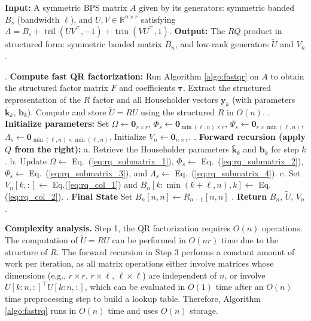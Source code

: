 \documentclass[a4paper,fleqn]{cas-sc}
\def\bfy{{\mathbf y}}
\DeclareMathOperator{\triu}{triu}
\DeclareMathOperator{\tril}{tril}
\begin{document}
\begin{algorithm}\caption{Fast RQ computation for Symmetric BPS Matrices}\label{algo:fastrq}
\begin{algorithmic}
\State \textbf{Input:} A symmetric BPS matrix $A$ given by its generators: symmetric banded $B_s$ (bandwidth $\ell$), and $U, V \in \mathbb{R}^{n \times r}$ satisfying $A = B_s + \tril(UV^\top, -1) + \triu(VU^\top, 1)$.
\State \textbf{Output:} The $RQ$ product in structured form: symmetric banded matrix $B_n$, and low-rank generators $\tilde U$ and $V_n$.

\Statex
{}. \textbf{Compute fast QR factorization:}
\State \quad Run Algorithm \ref{algo:fastqr} on $A$ to obtain the structured factor matrix $F$ and coefficients $\boldsymbol{\tau}$. Extract the structured representation of the $R$ factor and all Householder vectors $\bfy_k$ (with parameters $\bar{\mathbf{k}}_k$, $\mathbf{b}_k$).
\State \quad Compute and store $\tilde U = R U$ using the structured $R$ in $O(n)$.
\Statex
{}. \textbf{Initialize parameters:}
\State \quad Set $\Omega \gets \mathbf{0}_{r \times r}$, $\Phi_s \gets \mathbf{0}_{\min(\ell,n) \times r}$, $\Psi_s \gets \mathbf{0}_{r \times \min(\ell,n)}$, $\Lambda_s \gets \mathbf{0}_{\min(\ell,n) \times \min(\ell,n)}$.
\State \quad Initialize $V_n \gets \mathbf{0}_{n \times r}$.
\Statex
{}. \textbf{Forward recursion (apply $Q$ from the right):}
    \State a. Retrieve the Householder parameters $\bar{\mathbf{k}}_{k}$ and $\mathbf{b}_{k}$ for step $k$.
    \State b. Update
    $\Omega \gets$ Eq.~(\ref{eq:rq_submatrix_1}),
    $\Phi_s \gets$ Eq.~(\ref{eq:rq_submatrix_2}),
    $\Psi_s \gets$ Eq.~(\ref{eq:rq_submatrix_3}),
    and $\Lambda_s \gets$ Eq.~(\ref{eq:rq_submatrix_4}).
    \State c. Set 
    $V_n[k,:] \gets $ Eq.(\ref{eq:rq_col_1}) and $B_n[k:\min(k+\ell,n),k] \gets $ Eq.(\ref{eq:rq_col_2}).
\EndFor
\Statex
{}. \textbf{Final State}
\State \quad Set $B_n[n,n] \gets R_{n-1}[n,n]$
\Statex
{}. \textbf{Return} $B_n$, $\tilde U$, $V_n$.
\end{algorithmic}
\end{algorithm}

\textbf{Complexity analysis.} Step 1, the QR factorization requires $O(n)$ operations. The computation of $\tilde U = RU$ can be performed in $O(nr)$ time due to the structure of $R$. The forward recursion in Step 3 performs a constant amount of work per iteration, as all matrix operations either involve matrices whose dimensions (e.g., $r \times r$, $r \times \ell$, $\ell \times \ell$) are independent of $n$, or involve $U[k:n,:]^\top U[k:n,:]$, which can be evaluated in $O(1)$ time after an $O(n)$ time preprocessing step to build a lookup table. Therefore, Algorithm \ref{algo:fastrq} runs in $O(n)$ time and uses $O(n)$ storage.
\end{document}
